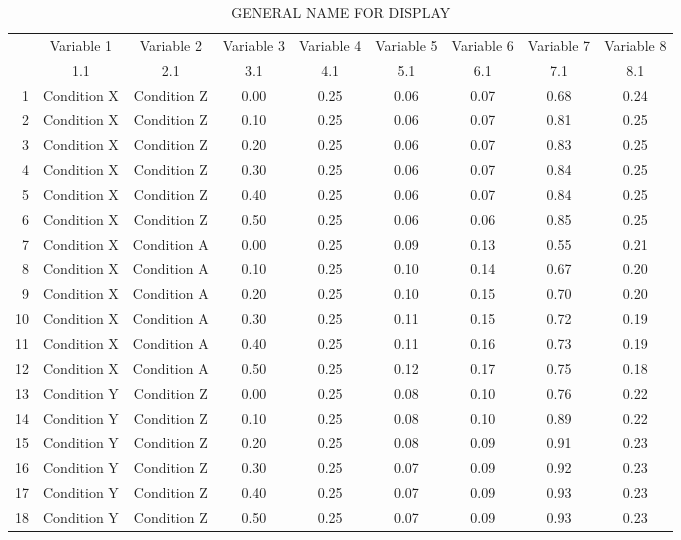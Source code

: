 \begin{table}[H]
\centering
\caption[NAME FOR TOC]{ GENERAL NAME FOR DISPLAY}
\label{tab:NDSum}
\begin{adjustbox}{width=\textwidth}
\begin{tabular}{|rcccccccc|}
  \hline
 & Variable 1 & Variable 2 & Variable 3 & Variable 4 & Variable 5 & Variable 6 & Variable 7 & Variable 8\\
  & 1.1 & 2.1 & 3.1 & 4.1 & 5.1 & 6.1 & 7.1 & 8.1\\
  \hline
1 & Condition X & Condition Z & 0.00 & 0.25 & 0.06 & 0.07 & 0.68 & 0.24 \\ 
  2 & Condition X & Condition Z & 0.10 & 0.25 & 0.06 & 0.07 & 0.81 & 0.25 \\ 
  3 & Condition X & Condition Z & 0.20 & 0.25 & 0.06 & 0.07 & 0.83 & 0.25 \\ 
  4 & Condition X & Condition Z & 0.30 & 0.25 & 0.06 & 0.07 & 0.84 & 0.25 \\ 
  5 & Condition X & Condition Z & 0.40 & 0.25 & 0.06 & 0.07 & 0.84 & 0.25 \\ 
  6 & Condition X & Condition Z & 0.50 & 0.25 & 0.06 & 0.06 & 0.85 & 0.25 \\ 
   \hline
  7 & Condition X & Condition A & 0.00 & 0.25 & 0.09 & 0.13 & 0.55 & 0.21 \\ 
  8 & Condition X & Condition A & 0.10 & 0.25 & 0.10 & 0.14 & 0.67 & 0.20 \\ 
  9 & Condition X & Condition A & 0.20 & 0.25 & 0.10 & 0.15 & 0.70 & 0.20 \\ 
  10 & Condition X & Condition A & 0.30 & 0.25 & 0.11 & 0.15 & 0.72 & 0.19 \\ 
  11 & Condition X & Condition A & 0.40 & 0.25 & 0.11 & 0.16 & 0.73 & 0.19 \\ 
  12 & Condition X & Condition A & 0.50 & 0.25 & 0.12 & 0.17 & 0.75 & 0.18 \\ 
   \hline
  13 & Condition Y & Condition Z & 0.00 & 0.25 & 0.08 & 0.10 & 0.76 & 0.22 \\ 
  14 & Condition Y & Condition Z & 0.10 & 0.25 & 0.08 & 0.10 & 0.89 & 0.22 \\ 
  15 & Condition Y & Condition Z & 0.20 & 0.25 & 0.08 & 0.09 & 0.91 & 0.23 \\ 
  16 & Condition Y & Condition Z & 0.30 & 0.25 & 0.07 & 0.09 & 0.92 & 0.23 \\ 
  17 & Condition Y & Condition Z & 0.40 & 0.25 & 0.07 & 0.09 & 0.93 & 0.23 \\ 
  18 & Condition Y & Condition Z & 0.50 & 0.25 & 0.07 & 0.09 & 0.93 & 0.23 \\ 

\end{tabular}
\end{adjustbox}
\end{table}
